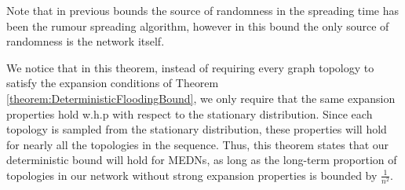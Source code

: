 Note that in previous bounds the source of randomness in the spreading time has been the rumour spreading algorithm, however in this bound the only source of randomness is the network itself.

We notice that in this theorem, instead of requiring every graph topology to satisfy the expansion conditions of Theorem \ref{theorem:DeterministicFloodingBound}, we only require that the same expansion properties hold w.h.p with respect to the stationary distribution. %
Since each topology is sampled from the stationary distribution, these properties will hold for nearly all the topologies in the sequence. Thus, this theorem states that our deterministic bound will hold for MEDNs, as long as the long-term proportion of topologies in our network without strong expansion properties is bounded by $\frac{1}{n^2}$.


